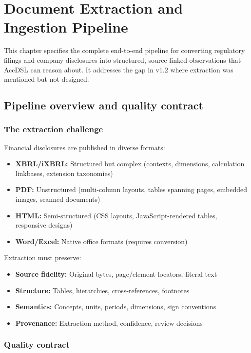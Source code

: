 \chapter{Document Extraction and Ingestion Pipeline}
\label{ch:extraction}

This chapter specifies the complete end-to-end pipeline for converting regulatory
filings and company disclosures into structured, source-linked observations that
AccDSL can reason about. It addresses the gap in v1.2 where extraction was
mentioned but not designed.

\section{Pipeline overview and quality contract}

\subsection{The extraction challenge}

Financial disclosures are published in diverse formats:
\begin{itemize}
\item \textbf{XBRL/iXBRL:} Structured but complex (contexts, dimensions, calculation
  linkbases, extension taxonomies)
\item \textbf{PDF:} Unstructured (multi-column layouts, tables spanning pages,
  embedded images, scanned documents)
\item \textbf{HTML:} Semi-structured (CSS layouts, JavaScript-rendered tables, responsive designs)
\item \textbf{Word/Excel:} Native office formats (requires conversion)
\end{itemize}

Extraction must preserve:
\begin{itemize}
\item \textbf{Source fidelity:} Original bytes, page/element locators, literal text
\item \textbf{Structure:} Tables, hierarchies, cross-references, footnotes
\item \textbf{Semantics:} Concepts, units, periods, dimensions, sign conventions
\item \textbf{Provenance:} Extraction method, confidence, review decisions
\end{itemize}

\subsection{Quality contract}


